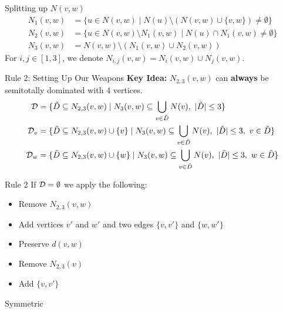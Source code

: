 \begin{frame}[c]{Splitting up $N(v,w)$}
    \begin{align}
        N_1(v,w) & = \{u \in N(v,w) \mid N(u) \setminus (N(v,w)\cup \{v,w\}) \neq \emptyset \}  \\
        N_2(v,w) & = \{u \in N(v,w)\setminus N_1(v,w) \mid N(u) \cap N_1(v,w) \neq \emptyset \} \\
        N_3(v,w) & =  N(v,w) \setminus (N_1(v,w) \cup N_2(v,w))
    \end{align}
    For $i,j \in [1,3]$, we denote $N_{i,j}(v,w) = N_i(v,w) \cup N_j(v,w)$.
\end{frame}


\begin{frame}[c]{Rule 2: Setting Up Our Weapons}
    \textbf{Key Idea: } $N_{2,3}(v, w)$ can \textbf{always} be semitotally dominated with 4 vertices.
    \pause\begin{align}
        \mathcal{D} & = \{ \tilde D \subseteq N_{2,3}(v,w)            \mid N_3(v,w) \subseteq \bigcup_{v \in \tilde D} N(v),\ |\tilde D| \leq 3                  \} \\
        \mathcal{D}_{v}  & = \{ \tilde D \subseteq N_{2,3}(v,w) \cup \{v\} \mid N_3(v,w) \subseteq \bigcup_{v \in \tilde D} N(v),\ |\tilde D| \leq 3,\ v \in \tilde D \} \\
        \mathcal{D}_{w}  & = \{ \tilde D \subseteq N_{2,3}(v,w) \cup \{w\} \mid N_3(v,w) \subseteq \bigcup_{v \in \tilde D} N(v),\ |\tilde D| \leq 3,\ w \in \tilde D \}
    \end{align}

\end{frame}

\begin{frame}[c]{Rule 2}
    If $\mathbf{\mathcal{D} = \emptyset}$ we apply the following:

    \begin{caseof}

        \begin{itemize}
            \item Remove $N_{2,3}(v,w)$
            \item Add vertices $v'$ and $w'$ and two edges $\{v, v'\}$ and $\{w, w'\}$
            \item Preserve $d(v,w)$
        \end{itemize}

        \begin{itemize}
            \item Remove $N_{2,3}(v)$
            \item Add $\{v, v'\}$
        \end{itemize}
        
         Symmetric
    \end{caseof}
\end{frame}

